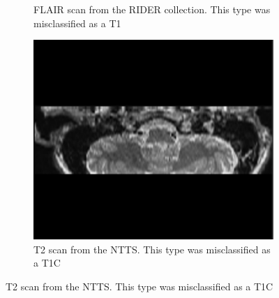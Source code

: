 \begin{figure}[htbp]
\begin{subfigure}[t]{0.25\textwidth}
        \caption{\gls{FLAIR} \gls{scan} from the \gls{RIDER} collection. This \gls{type} was misclassified as a \gls{T1}}\label{fig:RIDER_FLAIR}
    \end{subfigure}
    \hfill
    \begin{subfigure}[t]{0.25\textwidth}
        \centering
        \includegraphics[width=\textwidth]{Figures/T2_hippocampus.png}
        \caption{\gls{T2} \gls{scan} from the \gls{NTTS}. This \gls{type} was misclassified as a \gls{T1C}}\label{fig:T2_hippo}
    \end{subfigure}


\end{figure}
